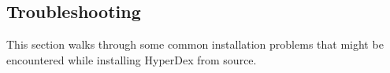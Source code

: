 %
%
%

\subsection{Troubleshooting}
\label{sec:installation:troubleshooting}

This section walks through some common installation problems that might be
encountered while installing HyperDex from source.

